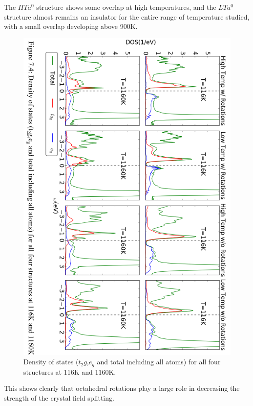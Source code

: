 \documentclass[10pt]{ruthesis}
\begin{document}
{The $HTa^0$ structure  shows some overlap at high temperatures, and the $LTa^0$ structure almost remains an insulator for the entire range of temperature studied, with a small overlap developing above 900K. 
%

\begin{figure}[H]
\begin{center}
\includegraphics[width=\columnwidth]{New_Dos_flipped.png}
\captionsetup{textformat=empty,labelformat=blank}
\caption{Density of states ($t_2g$,$e_g$ and total including all atoms) for all four structures at 116K and 1160K.}\label{LaCoO3_dos}
\end{center}
\end{figure}
This shows clearly that octahedral rotations play a large role in decreasing the strength of the crystal field splitting. 
}
\end{document}
